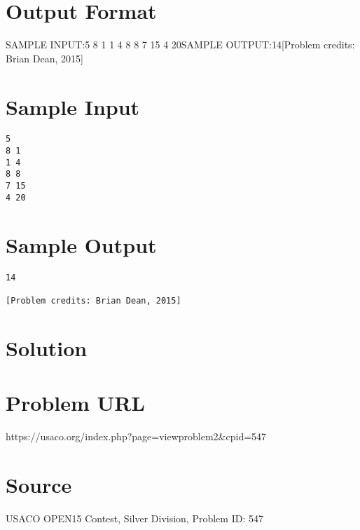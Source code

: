 \documentclass[12pt]{article}
\begin{document}
\section*{Output Format}
SAMPLE INPUT:5
8 1
1 4
8 8
7 15
4 20SAMPLE OUTPUT:14[Problem credits: Brian Dean, 2015]

\section*{Sample Input}
\begin{verbatim}
5
8 1
1 4
8 8
7 15
4 20
\end{verbatim}

\section*{Sample Output}
\begin{verbatim}
14

[Problem credits: Brian Dean, 2015]
\end{verbatim}

\section*{Solution}


\section*{Problem URL}
https://usaco.org/index.php?page=viewproblem2&cpid=547

\section*{Source}
USACO OPEN15 Contest, Silver Division, Problem ID: 547
\end{document}
